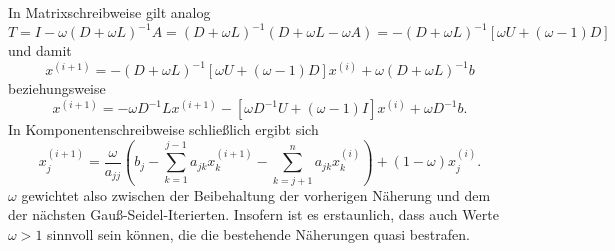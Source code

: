 In Matrixschreibweise gilt analog
\begin{equation}
  T = I - \omega(D + \omega L)^{-1} A = (D +
  \omega L)^{-1}(D + \omega L - \omega A) = -(D+\omega L)^{-1}
  \left[\omega U + (\omega-1) D\right]
\end{equation}
und damit
\begin{equation}
  x^{(i+1)} = -(D+\omega L)^{-1}
  \left[\omega U + (\omega-1) D\right]x^{(i)} +
  \omega(D + \omega L)^{-1} b
\end{equation}
beziehungsweise
\begin{equation}
  x^{(i+1)} = -\omega D^{-1}L x^{(i+1)}
  -\left[\omega D^{-1}U + (\omega-1)I\right]x^{(i)} +
  \omega D^{-1}b.
\end{equation}
In Komponentenschreibweise schließlich ergibt sich
\begin{equation}
  x_j^{(i+1)} = \frac{\omega}{a_{jj}}\left(
    b_j
    - \sum_{k=1}^{j-1} a_{jk} x_k^{(i+1)}
    - \sum_{k=j+1}^{n} a_{jk} x_k^{(i)}\right)
  + (1-\omega) x_j^{(i)}.
\end{equation}
$\omega$ gewichtet also zwischen der Beibehaltung der vorherigen
Näherung und dem der nächsten Gauß-Seidel-Iterierten. Insofern ist es
erstaunlich, dass auch Werte $\omega>1$ sinnvoll sein können, die die
bestehende Näherungen quasi bestrafen.

